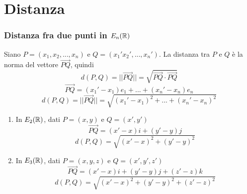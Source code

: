 \section{Distanza}
\subsubsection{Distanza fra due punti in \(E_n(\RR )\)}
Siano \(P = (x_{1} , x_{2}, ..., x_{n} )\) e \(Q = (x_{1} ' x_2 ', ..., x_n ')\). La distanza tra \(P\) e \(Q\) è la norma del vettore \(\vec{PQ}\), quindi\[
        d(P,Q) = ||\vec{PQ}|| = \sqrt{\vec{PQ} \cdot \vec{PQ}}
\]     \[
    \vec{{PQ}} = (x_1'-x_1) e_1 + ... + (x_n' - x_n) e_n
\] \[
    d(P,Q) = ||\vec{{PQ}}|| = \sqrt{(x_1' - x_1)^{2} + ... + (x_n'-x_n)^{2}  }
\]
\begin{enumerate}
    \item In \(E_{2}(\RR)\), dati \(P = (x, y) \) e \( Q = (x', y')\)\[
    \vec{{PQ}} = (x'- x) i + (y' - y)j
\] \[
    d (P, Q) = \sqrt{(x' - x)^{2} + (y'-y)^{2} }
\] 
    \item In \(E_{3}(\RR)\), dati \(P = (x, y,z) \) e \( Q = (x', y',z')\)\[
    \vec{{PQ}} = (x'- x) i + (y' - y)j + (z' - z)k
\] \[
    d (P, Q) = \sqrt{(x' - x)^{2} + (y'-y)^{2}  + (z' - z ) ^2}
\] 
\end{enumerate}
